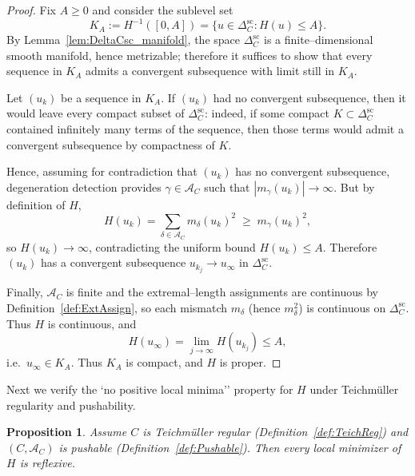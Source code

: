 \documentclass[a4paper,12pt]{amsart}
\theoremstyle{plain}
\newtheorem{proposition}[theorem]{Proposition}
\theoremstyle{definition}
\begin{document}
\begin{proof}
Fix $A\ge 0$ and consider the sublevel set
\[
K_A:=H^{-1}([0,A])=\{u\in \Delta_C^{\mathrm{sc}}: H(u)\le A\}.
\]
By Lemma~\ref{lem:DeltaCsc_manifold}, the space $\Delta_C^{\mathrm{sc}}$ is a finite--dimensional smooth manifold, hence
metrizable; therefore it suffices to show that every sequence in $K_A$ admits a convergent subsequence with limit still in
$K_A$.

Let $(u_k)$ be a sequence in $K_A$. If $(u_k)$ had no convergent subsequence, then it would leave every compact subset of
$\Delta_C^{\mathrm{sc}}$: indeed, if some compact $K\subset\Delta_C^{\mathrm{sc}}$ contained infinitely many terms of the
sequence, then those terms would admit a convergent subsequence by compactness of $K$.

Hence, assuming for contradiction that $(u_k)$ has no convergent subsequence, degeneration detection provides
$\gamma\in\mathcal A_C$ such that $|m_\gamma(u_k)|\longrightarrow\infty$. But by definition of $H$,
\[
H(u_k)=\sum_{\delta\in\mathcal A_C} m_\delta(u_k)^2 \;\ge\; m_\gamma(u_k)^2,
\]
so $H(u_k)\longrightarrow\infty$, contradicting the uniform bound $H(u_k)\le A$.
Therefore $(u_k)$ has a convergent subsequence $u_{k_j}\longrightarrow u_\infty$ in $\Delta_C^{\mathrm{sc}}$.

Finally, $\mathcal A_C$ is finite and the extremal--length assignments are continuous by
Definition~\ref{def:ExtAssign}, so each mismatch $m_\delta$ (hence $m_\delta^2$) is continuous on $\Delta_C^{\mathrm{sc}}$.
Thus $H$ is continuous, and
\[
H(u_\infty)=\lim_{j\longrightarrow\infty}H(u_{k_j})\le A,
\]
i.e.\ $u_\infty\in K_A$.
Thus $K_A$ is compact, and $H$ is proper.
\end{proof}

Next we verify the `no positive local minima'' property for $H$ under Teichm\"uller regularity and pushability.

\begin{proposition}\label{prop:NoNonreflexiveMin}
Assume $C$ is Teichm\"uller regular (Definition~\ref{def:TeichReg}) and $(C,\mathcal A_C)$ is pushable
(Definition~\ref{def:Pushable}). Then every local minimizer of $H$ is reflexive.
\end{proposition}
\end{document}
